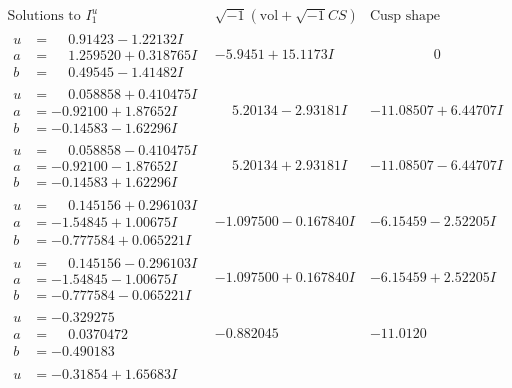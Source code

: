 \documentclass[1p]{elsarticle_modified}
\theoremstyle{definition}
\newcommand{\I}{\sqrt{-1}}
\begin{document}
$$\begin{array}{c|c|c}
\text{Solutions to }I^u_{1}& \I (\text{vol} + \sqrt{-1}CS) & \text{Cusp shape}\\
 \hline 
\begin{aligned}
u &= \phantom{-}0.91423 - 1.22132 I \\
a &= \phantom{-}1.259520 + 0.318765 I \\
b &= \phantom{-}0.49545 - 1.41482 I\end{aligned}
 & -5.9451 + 15.1173 I & \phantom{-0.000000 } 0 \\ \hline\begin{aligned}
u &= \phantom{-}0.058858 + 0.410475 I \\
a &= -0.92100 + 1.87652 I \\
b &= -0.14583 - 1.62296 I\end{aligned}
 & \phantom{-}5.20134 - 2.93181 I & -11.08507 + 6.44707 I \\ \hline\begin{aligned}
u &= \phantom{-}0.058858 - 0.410475 I \\
a &= -0.92100 - 1.87652 I \\
b &= -0.14583 + 1.62296 I\end{aligned}
 & \phantom{-}5.20134 + 2.93181 I & -11.08507 - 6.44707 I \\ \hline\begin{aligned}
u &= \phantom{-}0.145156 + 0.296103 I \\
a &= -1.54845 + 1.00675 I \\
b &= -0.777584 + 0.065221 I\end{aligned}
 & -1.097500 - 0.167840 I & -6.15459 - 2.52205 I \\ \hline\begin{aligned}
u &= \phantom{-}0.145156 - 0.296103 I \\
a &= -1.54845 - 1.00675 I \\
b &= -0.777584 - 0.065221 I\end{aligned}
 & -1.097500 + 0.167840 I & -6.15459 + 2.52205 I \\ \hline\begin{aligned}
u &= -0.329275\phantom{ +0.000000I} \\
a &= \phantom{-}0.0370472\phantom{ +0.000000I} \\
b &= -0.490183\phantom{ +0.000000I}\end{aligned}
 & -0.882045\phantom{ +0.000000I} & -11.0120\phantom{ +0.000000I} \\ \hline\begin{aligned}
u &= -0.31854 + 1.65683 I \\

\end{aligned}
\end{array}$$
\end{document}
